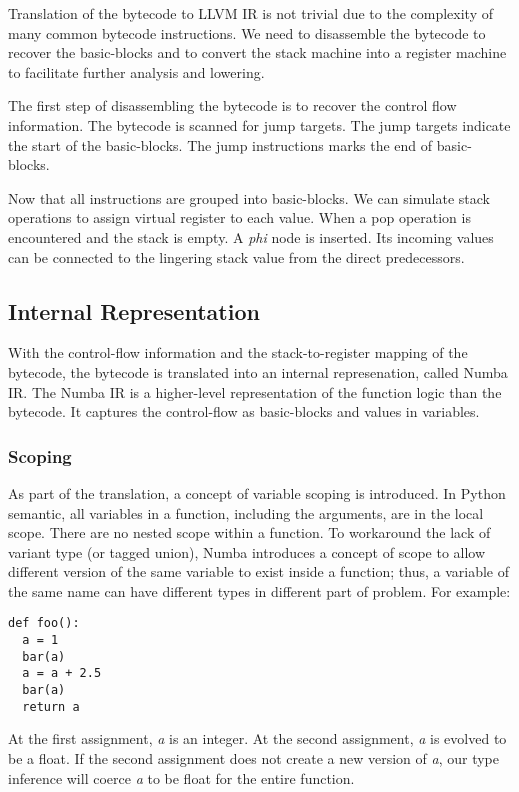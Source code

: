 \documentclass{acm_proc_article-sp}
\begin{document}
Translation of the bytecode to LLVM IR is not trivial due to the
complexity of many common bytecode instructions.  We need to disassemble
the bytecode to recover the basic-blocks and to convert the stack machine into
a register machine to facilitate further analysis and lowering.

The first step of disassembling the bytecode is to recover the control flow
information. The bytecode is scanned for jump targets. The jump targets
indicate the start of the basic-blocks.  The jump instructions marks the
end of basic-blocks.

Now that all instructions are grouped into basic-blocks. We can simulate stack
operations to assign virtual register to each value.
When a pop operation is encountered and the stack is empty.  A \textit{phi}
node is inserted. Its incoming values can be connected to the lingering stack
value from the direct predecessors.

\subsection{Internal Representation}

With the control-flow information and the stack-to-register mapping
of the bytecode, the bytecode is translated into an internal represenation,
called Numba IR. The Numba IR is a higher-level representation of the function
logic than the bytecode.  It captures the control-flow as basic-blocks and values
in variables.

\subsubsection{Scoping}
As part of the translation, a concept of variable scoping is introduced.
In Python semantic, all variables in a function, including the arguments,
are in the local scope.  There are no nested scope within a function.
To workaround the lack of variant type (or tagged union),
Numba introduces a concept of scope to allow different version of the same
variable to exist inside a function; thus, a variable of the same name can
have different types in different part of problem.  For example:

\begin{lstlisting}
def foo():
  a = 1
  bar(a)
  a = a + 2.5
  bar(a)
  return a
\end{lstlisting}

At the first assignment, \textit{a} is an integer. At the second assignment,
\textit{a} is evolved to be a float. If the second assignment does not create
a new version of \textit{a}, our type inference will coerce \textit{a} to be
float for the entire function.
\end{document}
